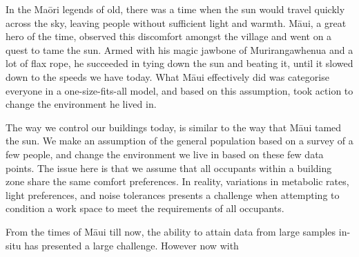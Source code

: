 
In the Ma\={o}ri legends of old, there was a time when the sun would travel quickly across the sky, leaving people without sufficient light and warmth. M\={a}ui, a great hero of the time, observed this discomfort amongst the village and went on a quest to tame the sun. Armed with his magic jawbone of Murirangawhenua and a lot of flax rope, he succeeded in tying down the sun and beating it, until it slowed down to the speeds we have today. What M\={a}ui effectively did was categorise everyone in a one-size-fits-all model, and based on this assumption, took action to change the environment he lived in. 

The way we control our buildings today, is similar to the way that M\={a}ui tamed the sun. We make an assumption of the general population based on a survey of a few people, and change the environment we live in based on these few data points. The issue here is that we assume that all occupants within a building zone share the same comfort preferences. In reality, variations in metabolic rates, light preferences, and noise tolerances presents a challenge when attempting to condition a work space to meet the requirements of all occupants. 



From the times of M\={a}ui till now, the ability to attain data from large samples in-situ has presented a large challenge. However now with 
















